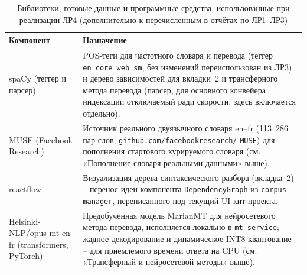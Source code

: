\begin{table}[H]
  \centering
  \caption{Библиотеки, готовые данные и программные средства, использованные при реализации ЛР4 (дополнительно к перечисленным в отчётах по ЛР1--ЛР3)}
  \label{tab:stack-translation}
  \small
  \begin{tabularx}{\textwidth}{|l|X|}
    \hline
    Компонент & Назначение \\
    \hline
    spaCy (теггер и парсер) & POS-теги для частотного словаря и
      перевода (теггер \texttt{en\_core\_web\_sm}, без изменений
      переиспользован из ЛР3) и дерево зависимостей для вкладки~2 и
      трансферного метода перевода (парсер, для основного конвейера
      индексации отключаемый ради скорости, здесь включается
      отдельно). \\
    \hline
    MUSE (Facebook Research) & Источник реального двуязычного словаря
      en--fr (113~286 пар слов, \texttt{github.com/facebookresearch/}
      \texttt{MUSE}) для пополнения стартового курируемого словаря
      (см. «Пополнение словаря реальными данными» выше). \\
    \hline
    reactflow & Визуализация дерева синтаксического разбора (вкладка~2)
      -- перенос идеи компонента \texttt{DependencyGraph} из
      \texttt{corpus-manager}, переписанного под текущий UI-кит проекта. \\
    \hline
    Helsinki-NLP/opus-mt-en-fr (transformers, PyTorch) & Предобученная
      модель MarianMT для нейросетевого метода перевода, исполняется
      локально в \texttt{mt-service}; жадное декодирование и
      динамическое INT8-квантование -- для приемлемого времени ответа
      на CPU (см. «Трансферный и нейросетевой методы» выше). \\
    \hline
  \end{tabularx}
\end{table}
